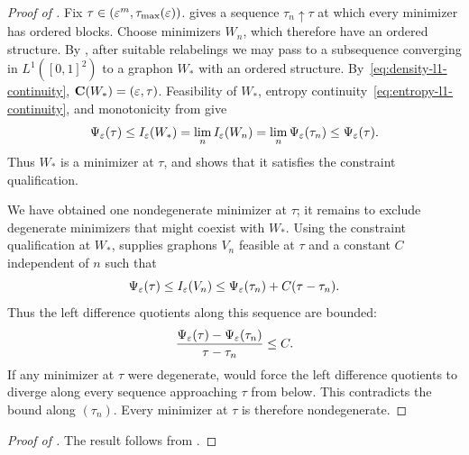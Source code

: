 \begin{proof}[Proof of ]
Fix $\tau\in(\varepsilon^m,\tau_{\max}(\varepsilon))$.
 gives a sequence $\tau_n\uparrow\tau$
at which every minimizer has ordered blocks. Choose minimizers $W_n$,
which therefore have an ordered structure. By ,
after suitable relabelings we may pass to a subsequence converging in
$L^1([0,1]^2)$ to a graphon $W_*$ with an ordered structure.
By~\eqref{eq:density-l1-continuity}, $\mathbf C(W_*)=(\varepsilon,\tau)$.
Feasibility of $W_*$, entropy continuity~\eqref{eq:entropy-l1-continuity},
and monotonicity from  give
\[
  \Psi_\varepsilon(\tau)\le I_\varepsilon(W_*)
  =\lim_n I_\varepsilon(W_n)=\lim_n\Psi_\varepsilon(\tau_n)\le\Psi_\varepsilon(\tau).
\]
Thus $W_*$ is a minimizer at $\tau$, and 
shows that it satisfies the constraint qualification.

We have obtained one nondegenerate minimizer at $\tau$; it remains to
exclude degenerate minimizers that might coexist with $W_*$.
Using the constraint qualification at $W_*$, 
supplies graphons $V_n$ feasible at $\tau$ and a constant $C$ independent
of $n$ such that
\[
  \Psi_\varepsilon(\tau)\le I_\varepsilon(V_n)
  \le\Psi_\varepsilon(\tau_n)+C(\tau-\tau_n).
\]
Thus the left difference quotients along this sequence are bounded:
\[
  \frac{\Psi_\varepsilon(\tau)-\Psi_\varepsilon(\tau_n)}{\tau-\tau_n}\le C.
\]
If any minimizer at $\tau$ were degenerate,
 would force the left difference
quotients to diverge along every sequence approaching $\tau$ from
below.  This contradicts the bound along $(\tau_n)$.
Every minimizer at $\tau$ is therefore nondegenerate.
\end{proof}

\begin{proof}[Proof of ]
The result follows from
.
\end{proof}
